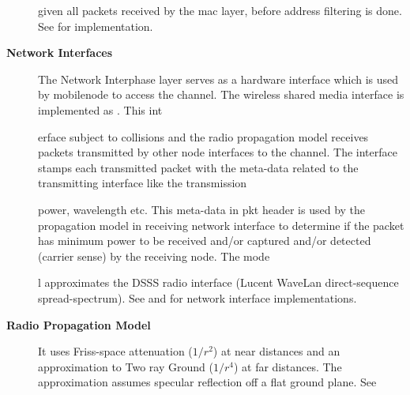 \begin{description}
given all packets received by the mac layer, before address filtering is done. See  for  implementation.

\item[{\bf Network Interfaces}] The Network Interphase layer serves as a hardware interface which is used by mobilenode to access the channel. The wireless shared media interface is implemented as . This int





















erface subject to collisions and the radio propagation model receives packets transmitted by other node interfaces to the channel. The interface stamps each transmitted packet with the meta-data related to the transmitting interface like the transmission 





















power, wavelength etc. This meta-data in pkt header is used by the propagation model in receiving network interface to determine if the packet has minimum power to be received and/or captured and/or detected (carrier sense) by the receiving node. The mode





















l approximates the DSSS radio interface (Lucent WaveLan direct-sequence spread-spectrum). See  and  for network interface implementations.

\item[{\bf Radio Propagation Model}]  It uses Friss-space attenuation ($1/r^2$) at near distances and an approximation to Two ray Ground ($1/r^4$) at far distances. The approximation assumes specular reflection off a flat ground plane. See 
\end{description}
